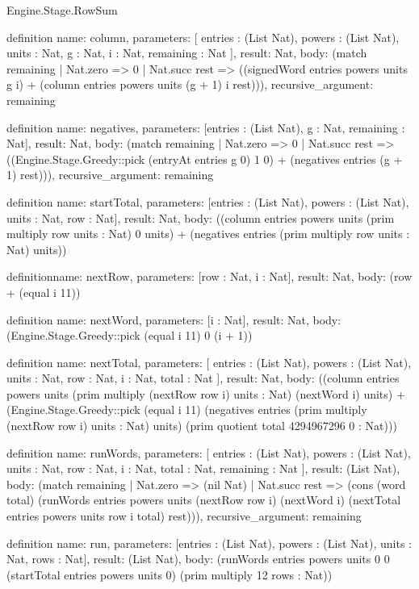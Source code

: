 \begin{lexlean}{Engine.Stage.RowSum}
\begin{semanticmodule}
definition{
  name: column,
  parameters: [
    entries : (List Nat),
    powers : (List Nat),
    units : Nat,
    g : Nat,
    i : Nat,
    remaining : Nat
  ],
  result: Nat,
  body: (match remaining
    | Nat.zero => 0
    | Nat.succ rest => ((signedWord entries powers units g i) + (column entries powers units (g + 1) i rest))),
  recursive_argument: remaining
}

definition{
  name: negatives,
  parameters: [entries : (List Nat), g : Nat, remaining : Nat],
  result: Nat,
  body: (match remaining
    | Nat.zero => 0
    | Nat.succ rest => ((Engine.Stage.Greedy::pick (entryAt entries g 0) 1 0) + (negatives entries (g + 1) rest))),
  recursive_argument: remaining
}

definition{
  name: startTotal,
  parameters: [entries : (List Nat), powers : (List Nat), units : Nat, row : Nat],
  result: Nat,
  body: ((column entries powers units (prim multiply row units : Nat) 0 units) + (negatives entries (prim multiply row units : Nat) units))
}

definition{name: nextRow, parameters: [row : Nat, i : Nat], result: Nat, body: (row + (equal i 11))}

definition{
  name: nextWord,
  parameters: [i : Nat],
  result: Nat,
  body: (Engine.Stage.Greedy::pick (equal i 11) 0 (i + 1))
}

definition{
  name: nextTotal,
  parameters: [
    entries : (List Nat),
    powers : (List Nat),
    units : Nat,
    row : Nat,
    i : Nat,
    total : Nat
  ],
  result: Nat,
  body: ((column entries powers units (prim multiply (nextRow row i) units : Nat) (nextWord i) units) + (Engine.Stage.Greedy::pick (equal i 11) (negatives entries (prim multiply (nextRow row i) units : Nat) units) (prim quotient total 4294967296 0 : Nat)))
}

definition{
  name: runWords,
  parameters: [
    entries : (List Nat),
    powers : (List Nat),
    units : Nat,
    row : Nat,
    i : Nat,
    total : Nat,
    remaining : Nat
  ],
  result: (List Nat),
  body: (match remaining
    | Nat.zero => (nil Nat)
    | Nat.succ rest => (cons (word total) (runWords entries powers units (nextRow row i) (nextWord i) (nextTotal entries powers units row i total) rest))),
  recursive_argument: remaining
}

definition{
  name: run,
  parameters: [entries : (List Nat), powers : (List Nat), units : Nat, rows : Nat],
  result: (List Nat),
  body: (runWords entries powers units 0 0 (startTotal entries powers units 0) (prim multiply 12 rows : Nat))
}
\end{semanticmodule}
\end{lexlean}
